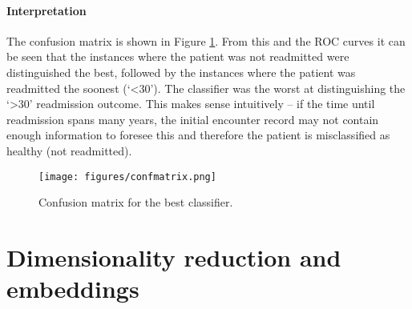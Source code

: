 \documentclass[10pt, twocolumn]{article}
\begin{document}
\paragraph{Interpretation} The confusion matrix is shown in Figure \ref{confmatrix}. From this and the ROC curves it can be seen that the instances where the patient was not readmitted were distinguished the best, followed by the instances where the patient was readmitted the soonest (‘<30’). The classifier was the worst at distinguishing the ‘>30’ readmission outcome. This makes sense intuitively – if the time until readmission spans many years, the initial encounter record may not contain enough information to foresee this and therefore the patient is misclassified as healthy (not readmitted).

\begin{figure}[htb!]
	\centering
	\texttt{[image: figures/confmatrix.png]}
	\caption{Confusion matrix for the best classifier.}\label{confmatrix}
\end{figure}

\section{Dimensionality reduction and embeddings}


\medskip
 


\end{document}
